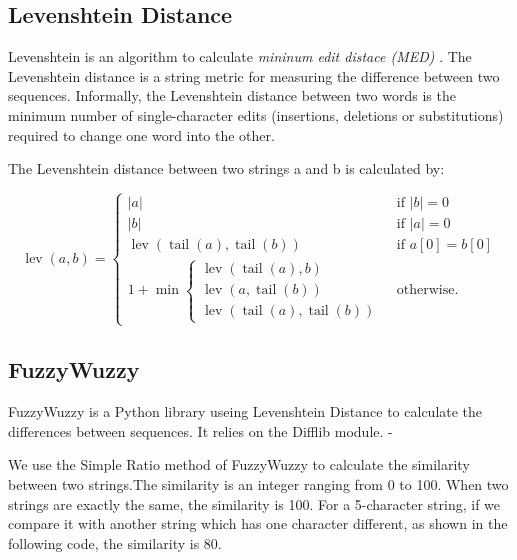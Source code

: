 \documentclass[technicalreport]{ieicej}
\begin{document}
    \subsection{Levenshtein Distance}
        Levenshtein is an algorithm to calculate {\em mininum edit distace (MED)} \cite{fuzzywuzzy-guidence}. The Levenshtein distance is a string metric for measuring the difference between two sequences. Informally, the Levenshtein distance between two words is the minimum number of single-character edits (insertions, deletions or substitutions) required to change one word into the other. \cite{levenshtein}

        The Levenshtein distance between two strings a and b is calculated by:

        \[
            \operatorname{lev}(a, b)=\left\{\begin{array}{ll}
            |a| & \text { if }|b|=0 \\
            |b| & \text { if }|a|=0 \\
            \operatorname{lev}(\operatorname{tail}(a), \operatorname{tail}(b)) & \text { if } a[0]=b[0] \\
            1+\min \left\{\begin{array}{l}
            \operatorname{lev}(\operatorname{tail}(a), b) \\
            \operatorname{lev}(a, \operatorname{tail}(b)) \\
            \operatorname{lev}(\operatorname{tail}(a), \operatorname{tail}(b))
            \end{array}\right. & \text { otherwise. }
            \end{array}\right.
        \]

    \subsection{FuzzyWuzzy}
        FuzzyWuzzy is a Python library useing Levenshtein Distance to calculate the differences between sequences. It relies on the Difflib module. \cite{fuzzywuzzy}-\cite{fuzzywuzzy-git}

        We use the Simple Ratio method of FuzzyWuzzy to calculate the similarity between two strings.The similarity is an integer ranging from 0 to 100. When two strings are exactly the same, the similarity is 100. For a 5-character string, if we compare it with another string which has one character different, as shown in the following code, the similarity is 80.
        
\end{document}
